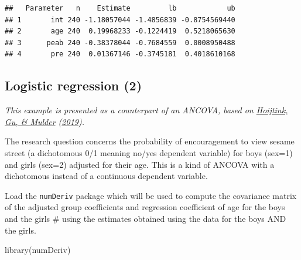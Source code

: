 \documentclass[
]{book}
\newenvironment{Shaded}{\begin{snugshade}}{\end{snugshade}}
\newcommand{\CommentTok}[1]{\textcolor[rgb]{0.56,0.35,0.01}{\textit{#1}}}
\newcommand{\FunctionTok}[1]{\textcolor[rgb]{0.00,0.00,0.00}{#1}}
\newcommand{\NormalTok}[1]{#1}
\newcommand{\OtherTok}[1]{\textcolor[rgb]{0.56,0.35,0.01}{#1}}
\newcommand{\SpecialCharTok}[1]{\textcolor[rgb]{0.00,0.00,0.00}{#1}}
\begin{document}
\begin{verbatim}
##   Parameter   n    Estimate         lb            ub
## 1       int 240 -1.18057044 -1.4856839 -0.8754569440
## 2       age 240  0.19968233 -0.1224419  0.5218065630
## 3      peab 240 -0.38378044 -0.7684559  0.0008950488
## 4       pre 240  0.01367146 -0.3745181  0.4018610168
\end{verbatim}

\hypertarget{logistic-regression-2}{%
\subsection{Logistic regression (2)}\label{logistic-regression-2}}

\emph{This example is presented as a counterpart of an ANCOVA, based on \protect\hyperlink{ref-hoijtink2019bayesian}{Hoijtink, Gu, \& Mulder} (\protect\hyperlink{ref-hoijtink2019bayesian}{2019}).}

The research question concerns the probability of encouragement to view
sesame street (a dichotomous 0/1 meaning no/yes dependent variable) for
boys (sex=1) and girls (sex=2) adjusted for their age. This is a kind of
ANCOVA with a dichotomous instead of a continuous dependent variable.

Load the \texttt{numDeriv} package which will be used to compute the covariance matrix of the adjusted group coefficients and regression coefficient of age for the boys and the girls \# using the estimates obtained using the data for the boys AND the girls.

\begin{Shaded}
\begin{Highlighting}[]
\FunctionTok{library}\NormalTok{(numDeriv)}
\end{Highlighting}
\end{Shaded}

\begin{Shaded}
\end{Shaded}
\end{document}
